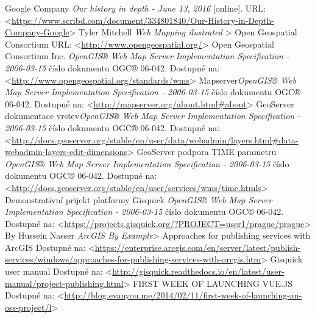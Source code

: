 \documentclass[12pt,a4paper]{article}
\begin{document}
\newpage
\begin{thebibliography}{99}
\label{Bibliography}
Google Company \textit{Our history in depth - June 13, 2016} [online].
URL: \textless\url{https://www.scribd.com/document/334801840/Our-History-in-Depth-Company-Google}\textgreater
{}
Tyler Mitchell \textit{Web Mapping ilustrated }\textgreater
{}
Open Geospatial Consortium %
URL: \textless\url{http://www.opengeospatial.org/}\textgreater
{}
Open Geospatial Consortium Inc. \textit{OpenGIS® Web Map Server Implementation Specification - 2006-03-15} číslo dokumentu OGC® 06-042.
Dostupné na: \textless\url{http://www.opengeospatial.org/standards/wms}\textgreater
{}
Mapserver\textit{OpenGIS® Web Map Server Implementation Specification - 2006-03-15} číslo dokumentu OGC® 06-042.
Dostupné na: \textless\url{http://mapserver.org/about.html#about}\textgreater
{}
GeoServer dokumentace vrstev\textit{OpenGIS® Web Map Server Implementation Specification - 2006-03-15} číslo dokumentu OGC® 06-042.
Dostupné na: \textless\url{http://docs.geoserver.org/stable/en/user/data/webadmin/layers.html#data-webadmin-layers-edit-dimensions}\textgreater
{}
GeoServer podpora TIME parametru \textit{OpenGIS® Web Map Server Implementation Specification - 2006-03-15} číslo dokumentu OGC® 06-042.
Dostupné na: \textless\url{http://docs.geoserver.org/stable/en/user/services/wms/time.htmls}\textgreater
{}
Demonstrativní prijekt platformy Gisquick \textit{OpenGIS® Web Map Server Implementation Specification - 2006-03-15} číslo dokumentu OGC® 06-042.
Dostupné na: \textless\url{https://projects.gisquick.org/?PROJECT=user1/prague/prague}\textgreater
{}
By Hussein Nasser \textit{ArcGIS By Example}\textgreater
{}
Approaches for publishing services with ArcGIS \textit{}
Dostupné na: \textless\url{https://enterprise.arcgis.com/en/server/latest/publish-services/windows/approaches-for-publishing-services-with-arcgis.htm}\textgreater
{}
Gisquick user manual \textit{}
Dostupné na: \textless\url{http://gisquick.readthedocs.io/en/latest/user-manual/project-publishing.html}\textgreater
{}
FIRST WEEK OF LAUNCHING VUE.JS \textit{}
Dostupné na: \textless\url{http://blog.evanyou.me/2014/02/11/first-week-of-launching-an-oss-project/l}\textgreater

\end{thebibliography}
\end{document}
